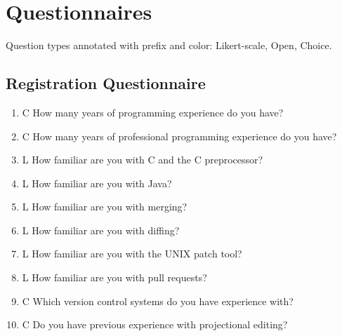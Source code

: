 \chapter{Questionnaires}\label{a:questionnaires}
Question types annotated with prefix and color: \colorbox{likert}{Likert-scale}, \colorbox{openq}{Open}, \colorbox{choice}{Choice}.

\section{Registration Questionnaire}
\begin{enumerate}
    \item \colorbox{choice}{C} How many years of programming experience do you have?
    \item \colorbox{choice}{C} How many years of professional programming experience do you have?
    \item \colorbox{likert}{L} How familiar are you with C and the C preprocessor?
    \item \colorbox{likert}{L} How familiar are you with Java?
    \item \colorbox{likert}{L} How familiar are you with merging?
    \item \colorbox{likert}{L} How familiar are you with diffing?
    \item \colorbox{likert}{L} How familiar are you with the UNIX patch tool?
    \item \colorbox{likert}{L} How familiar are you with pull requests?
    \item \colorbox{choice}{C} Which version control systems do you have experience with?
    \item \colorbox{choice}{C} Do you have previous experience with projectional editing?
\end{enumerate}

